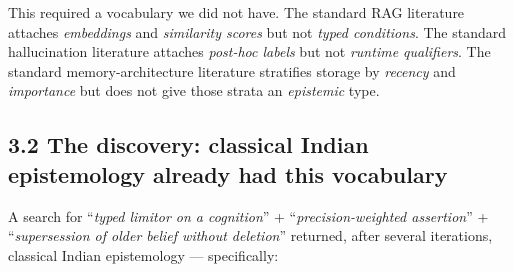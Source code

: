 This required a vocabulary we did not have. The standard RAG literature attaches \emph{embeddings} and \emph{similarity scores} but not \emph{typed conditions}. The standard hallucination literature attaches \emph{post-hoc labels} but not \emph{runtime qualifiers}. The standard memory-architecture literature \citep{sumers2024coala, packer2023memgpt} stratifies storage by \emph{recency} and \emph{importance} but does not give those strata an \emph{epistemic} type.

\subsection{3.2 The discovery: classical Indian epistemology already had this vocabulary}\label{the-discovery-classical-indian-epistemology-already-had-this-vocabulary}

A search for ``\emph{typed limitor on a cognition}'' + ``\emph{precision-weighted assertion}'' + ``\emph{supersession of older belief without deletion}'' returned, after several iterations, classical Indian epistemology --- specifically:

